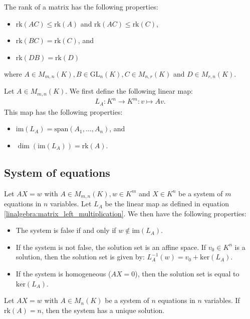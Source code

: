     \begin{property}\label{linalgebra:rank_properties}
        The rank of a matrix has the following properties:
        \begin{itemize}
            \item $\text{rk}(AC)\leq\text{rk}(A)$ and $\text{rk}(AC)\leq\text{rk}(C)$,
            \item $\text{rk}(BC)=\text{rk}(C)$, and
            \item $\text{rk}(DB)=\text{rk}(D)$
        \end{itemize}
        where $A\in M_{m,n}(K), B\in\text{GL}_n(K), C\in M_{n,r}(K)$ and $D\in M_{r,n}(K)$.
    \end{property}
    \begin{property}\label{linalgebra:dim_matrix_left_multiplication}
        Let $A\in M_{m,n}(K)$. We first define the following linear map:
        \begin{gather}
            \label{linalgebra:matrix_left_multiplication}
            L_A:K^n\rightarrow K^m:v\mapsto Av.
        \end{gather}
        This map has the following properties:
        \begin{itemize}
            \item $\text{im}(L_A) = \text{span}(A_1,\ldots,A_n)$, and
            \item $\dim(\text{im}(L_A))=\text{rk}(A)$.
        \end{itemize}
    \end{property}

\subsection{System of equations}

    \begin{property}\label{linalgebra:matrix_and_equations}
        Let $AX=w$ with $A\in M_{m,n}(K), w\in K^m$ and $X\in K^n$ be a system of $m$ equations in $n$ variables. Let $L_A$ be the linear map as defined in equation \ref{linalgebra:matrix_left_multiplication}. We then have the following properties:
        \begin{itemize}
            \item The system is false if and only if $w\not\in\text{im}(L_A)$.
            \item If the system is not false, the solution set is an affine space. If $v_0\in K^n$ is a solution, then the solution set is given by: $L_A^{-1}(w)=v_0+\text{ker}(L_A)$.
            \item If the system is homogeneous ($AX=0$), then the solution set is equal to $\text{ker}(L_A)$.
        \end{itemize}
    \end{property}
    \begin{property}[Uniqueness]\label{linalgebra:rank_unique_solution}
        Let $AX=w$ with $A\in M_n(K)$ be a system of $n$ equations in $n$ variables. If $\text{rk}(A)=n$, then the system has a unique solution.
    \end{property}

